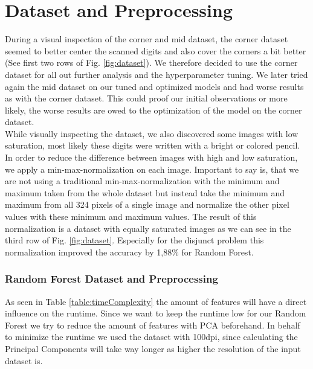 \documentclass[conference]{IEEEtran}
\begin{document}
\section{Dataset and Preprocessing}
\textcolor{til}{
    During a visual inspection of the corner and mid dataset, the corner dataset seemed to better center the scanned digits and also cover the corners a bit better (See first two rows of Fig. \ref{fig:dataset}). We therefore decided to use the corner dataset for all out further analysis and the hyperparameter tuning. We later tried again the mid dataset on our tuned and optimized models and had worse results as with the corner dataset. This could proof our initial observations or more likely, the worse results are owed to the optimization of the model on the corner dataset. \\
    While visually inspecting the dataset, we also discovered some images with low saturation, most likely these digits were written with a bright or colored pencil. In order to reduce the difference between images with high and low saturation, we apply a min-max-normalization on each image. Important to say is, that we are not using a traditional min-max-normalization with the minimum and maximum taken from the whole dataset but instead take the minimum and maximum from all 324 pixels of a single image and normalize the other pixel values with these minimum and maximum values. The result of this normalization is a dataset with equally saturated images as we can see in the third row of Fig. \ref{fig:dataset}. Especially for the disjunct problem this normalization improved the accuracy by 1,88\% for Random Forest.
}
\subsubsection{Random Forest Dataset and Preprocessing}
\textcolor{til}{
    As seen in Table \ref{table:timeComplexity} the amount of features will have a direct influence on the runtime. Since we want to keep the runtime low for our Random Forest we try to reduce the amount of features with PCA beforehand. In behalf to minimize the runtime we used the dataset with 100dpi, since calculating the Principal Components will take way longer as higher the resolution of the input dataset is.
}
\end{document}
